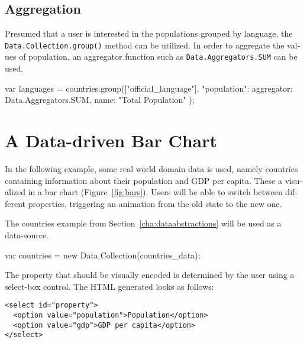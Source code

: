 \begin{english}
\subsection{Aggregation}

Presumed that a user is interested in the populations grouped by language, the \texttt{Data.Collection.group()} method can be utilized. In order to aggregate the values of population, an aggregator function such as \texttt{Data.Aggregators.SUM} can be used.


\begin{program}
\begin{CppSourceCode}
var languages = countries.group(["official_language"], {
  "population": {
    aggregator: Data.Aggregators.SUM, 
    name: "Total Population"
  }
});
\end{CppSourceCode}
\end{program}


\section{A Data-driven Bar Chart}

In the following example, some real world domain data is used, namely countries containing information about their population and GDP per capita. These a visualized in a bar chart (Figure~\ref{fig:bars}). Users will be able to switch between different properties, triggering an animation from the old state to the new one. 

\SuperPar The countries example from Section~\ref{cha:dataabstractions} will be used as a data-source.


\begin{program}
\begin{CppSourceCode}
var countries = new Data.Collection(countries_data);
\end{CppSourceCode}
\end{program}


\SuperPar The property that should be visually encoded is determined by the user using a select-box control. The HTML generated looks as follows:

\begin{program}
\begin{CppSourceCode}
\begin{verbatim}
<select id="property">
  <option value="population">Population</option>
  <option value="gdp">GDP per capita</option>
</select>
\end{verbatim}
\end{CppSourceCode}
\end{program}



\end{english}
